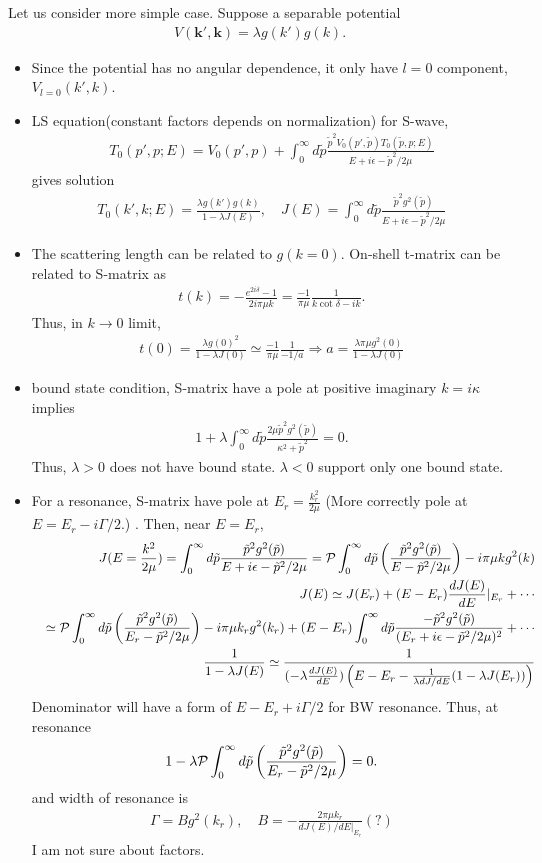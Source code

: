 \documentclass[10pt]{book}
\def\bm{\boldsymbol}
\newcommand{\bea}{\begin{eqnarray}}
\newcommand{\eea}{\end{eqnarray}}
\newcommand{\no}{\nonumber \\}
\def\vk{{\bm k}}
\begin{document}
Let us consider more simple case. Suppose a separable potential
\bea 
V(\vk',\vk)=\lambda g(k')g(k).
\eea 
\begin{itemize}
	\item Since the potential has no angular dependence, it only have $l=0$ component, $V_{l=0}(k',k)$.
	\item LS equation(constant factors depends on normalization) for S-wave,
	\bea 
	 T_{0}(p',p;E)=V_0(p',p)+\int_0^\infty d\tilde{p} 
	 \frac{\tilde{p}^2 V_0(p',\tilde{p})T_0(\tilde{p},{p};E)}{E+i\epsilon-\tilde{p}^2/2\mu} 
	\eea 
	gives solution
	\bea 
	T_0(k',k;E)=\frac{\lambda g(k')g(k)}{1-\lambda J(E)},\quad 
	         J(E)=\int_0^\infty d\tilde{p} 
	             \frac{\tilde{p}^2 g^2(\tilde{p})}{E+i\epsilon-\tilde{p}^2/2\mu} 
	\eea 
	\item The scattering length can be related to $g(k=0)$. On-shell t-matrix can be related to S-matrix as 
	\bea 
	t(k)= -\frac{e^{2i\delta}-1}{2i\pi\mu k}=\frac{-1}{\pi\mu}\frac{1}{k\cot\delta-ik}.
	\eea 
	Thus, in $k\to 0$ limit,
	\bea 
	t(0)=\frac{\lambda g(0)^2}{1-\lambda J(0)}\simeq \frac{-1}{\pi\mu}\frac{1}{-1/a}
	\Rightarrow a =\frac{\lambda \pi \mu g^2(0)}{1-\lambda J(0)}
	\eea 
	\item bound state condition, S-matrix have a pole at positive imaginary $k=i\kappa$ implies 
	\bea 
	1+\lambda \int_0^\infty d\tilde{p} 
	\frac{2\mu \tilde{p}^2 g^2(\tilde{p})}{\kappa^2+\tilde{p}^2} =0.
	\eea 
	Thus, $\lambda>0$ does not have bound state. $\lambda<0$ support only one bound state. 
	\item For a resonance, S-matrix have pole at $E_r=\frac{k_r^2}{2\mu}$
	(More correctly pole at $E=E_r-i\Gamma/2$.)
	 . Then, near $E=E_r$,
	 \bea 
	 & & J(E=\frac{k^2}{2\mu})= \int_0^\infty d\tilde{p} 
	              \frac{\tilde{p}^2 g^2(\tilde{p})}{E + i\epsilon-\tilde{p}^2/2\mu}
	           = {\cal P}\int_0^\infty d\tilde{p} \left(\frac{\tilde{p}^2 g^2(\tilde{p})}{E -\tilde{p}^2/2\mu} \right) 
	           -i\pi \mu k g^2(k)  \no 
	 & & J(E)\simeq J(E_r)+(E-E_r)\frac{d J(E)}{dE}|_{E_r}+\cdots \no 
	 & &   \simeq {\cal P}\int_0^\infty d\tilde{p} \left(\frac{\tilde{p}^2 g^2(\tilde{p})}{E_r -\tilde{p}^2/2\mu} \right) 
	 -i\pi \mu k_r g^2(k_r) +(E-E_r) \int_0^\infty d\tilde{p} 
	 \frac{-\tilde{p}^2 g^2(\tilde{p})}{(E_r + i\epsilon-\tilde{p}^2/2\mu)^2} +\cdots  \no          
	 & & \frac{1}{1-\lambda J(E)}\simeq \frac{1}{(-\lambda \frac{dJ(E)}{dE})\left(E-E_r-\frac{1}{\lambda dJ/dE}(1-\lambda J(E_r)) \right)   } 
	 \eea 
	  Denominator will have a form of $E-E_r+i\Gamma/2$ for BW resonance.  
	  Thus, at resonance
	  \bea 
	  1-\lambda {\cal P}\int_0^\infty d\tilde{p} \left(\frac{\tilde{p}^2 g^2(\tilde{p})}{E_r -\tilde{p}^2/2\mu} \right) =0.
	  \eea 
	  and width of resonance is 
	  \bea 
	  \Gamma= B g^2(k_r), \quad B=-\frac{2\pi\mu k_r}{dJ(E)/dE|_{E_r}} (?)
	  \eea 
	  I am not sure about factors. 
\end{itemize}
\end{document}
